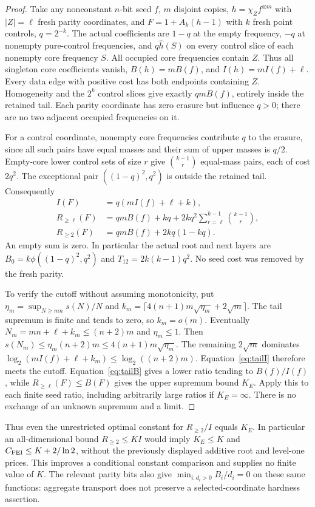 \begin{proof}
Take any nonconstant $n$-bit seed $f$, $m$ disjoint copies,
$h=\chi_Z f^{\otimes m}$ with $|Z|=\ell$ fresh parity coordinates,
and $F=1+A_k(h-1)$ with $k$ fresh point controls, $q=2^{-k}$.
The actual coefficients are $1-q$ at the empty frequency, $-q$ at
nonempty pure-control frequencies, and $q\widehat h(S)$ on every
control slice of each nonempty core frequency $S$.
All occupied core frequencies contain $Z$. Thus all singleton core
coefficients vanish, $B(h)=mB(f)$, and $I(h)=mI(f)+\ell$.
Every data edge with positive cost has both endpoints containing $Z$.
Homogeneity and the $2^k$ control slices give exactly $qmB(f)$,
entirely inside the retained tail. Each parity coordinate has zero erasure
but influence $q>0$; there are no two adjacent occupied frequencies on it.

For a control coordinate, nonempty core frequencies contribute $q$
to the erasure, since all such pairs have equal masses and their sum
of upper masses is $q/2$. Empty-core lower control sets of size $r$
give $\binom{k-1}{r}$ equal-mass pairs, each of cost $2q^2$.
The exceptional pair $((1-q)^2,q^2)$ is outside the retained tail.
Consequently
\begin{align}
I(F)&=q(mI(f)+\ell+k),\label{eq:tailI}\\
R_{\ge\ell}(F)&=qmB(f)+kq+
 2kq^2\sum_{r=\ell}^{k-1}\binom{k-1}{r},\label{eq:tailB}\\
R_{\ge2}(F)&=qmB(f)+2kq(1-kq).\label{eq:tailtwo}
\end{align}
An empty sum is zero. In particular the actual root and next layers are
$B_0=k\phi((1-q)^2,q^2)$ and $T_{12}=2k(k-1)q^2$.
No seed cost was removed by the fresh parity.

To verify the cutoff without assuming monotonicity, put
$\eta_m=\sup_{N\ge mn}s(N)/N$ and
$k_m=\lceil4(n+1)m\sqrt{\eta_m}+2\sqrt m\rceil$.
The tail supremum is finite and tends to zero, so $k_m=o(m)$.
Eventually $N_m=mn+\ell+k_m\le(n+2)m$ and $\eta_m\le1$.
Then $s(N_m)\le\eta_m(n+2)m\le4(n+1)m\sqrt{\eta_m}$.
The remaining $2\sqrt m$ dominates
$\log_2(mI(f)+\ell+k_m)\le\log_2((n+2)m)$.
Equation~\eqref{eq:tailI} therefore meets the cutoff. Equation~\eqref{eq:tailB}
gives a lower ratio tending to $B(f)/I(f)$, while
$R_{\ge\ell}(F)\le B(F)$ gives the upper supremum bound $K_E$.
Apply this to each finite seed ratio, including arbitrarily large ratios
if $K_E=\infty$. There is no exchange of an unknown supremum and a limit.
\end{proof}
Thus even the unrestricted optimal constant for $R_{\ge2}/I$ equals $K_E$.
In particular an all-dimensional bound $R_{\ge2}\le KI$ would imply
$K_E\le K$ and $C_{\rm FEI}\le K+2/\ln2$, without the previously
displayed additive root and level-one prices. This improves a conditional
constant comparison and supplies no finite value of $K$.
The relevant parity bits also give
$\min_{i:d_i>0}B_i/d_i=0$ on these same functions: aggregate transport
does not preserve a selected-coordinate hardness assertion.

